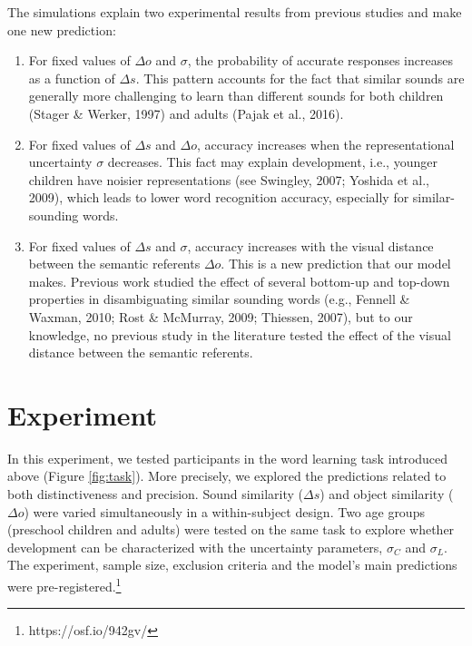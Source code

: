 \documentclass[english,,man,floatsintext]{apa6}
\let\rmarkdownfootnote\footnote%
\def\footnote{\protect\rmarkdownfootnote}
\theoremstyle{definition}
\theoremstyle{definition}
\theoremstyle{definition}
\theoremstyle{remark}
\begin{document}
The simulations explain two experimental results from previous studies
and make one new prediction:

\begin{enumerate}
\def\labelenumi{\arabic{enumi})}
\item
  For fixed values of \(\Delta o\) and \(\sigma\), the probability of
  accurate responses increases as a function of \(\Delta s\). This
  pattern accounts for the fact that similar sounds are generally more
  challenging to learn than different sounds for both children (Stager
  \& Werker, 1997) and adults (Pajak et al., 2016).
\item
  For fixed values of \(\Delta s\) and \(\Delta o\), accuracy increases
  when the representational uncertainty \(\sigma\) decreases. This fact
  may explain development, i.e., younger children have noisier
  representations (see Swingley, 2007; Yoshida et al., 2009), which
  leads to lower word recognition accuracy, especially for
  similar-sounding words.
\item
  For fixed values of \(\Delta s\) and \(\sigma\), accuracy increases
  with the visual distance between the semantic referents \(\Delta o\).
  This is a new prediction that our model makes. Previous work studied
  the effect of several bottom-up and top-down properties in
  disambiguating similar sounding words (e.g., Fennell \& Waxman, 2010;
  Rost \& McMurray, 2009; Thiessen, 2007), but to our knowledge, no
  previous study in the literature tested the effect of the visual
  distance between the semantic referents.
\end{enumerate}

\section{Experiment}\label{experiment}

In this experiment, we tested participants in the word learning task
introduced above (Figure \ref{fig:task}). More precisely, we explored
the predictions related to both distinctiveness and precision. Sound
similarity (\(\Delta s\)) and object similarity (\(\Delta o\)) were
varied simultaneously in a within-subject design. Two age groups
(preschool children and adults) were tested on the same task to explore
whether development can be characterized with the uncertainty
parameters, \(\sigma_C\) and \(\sigma_L\). The experiment, sample size,
exclusion criteria and the model's main predictions were
pre-registered.\footnote{https://osf.io/942gv/}
\end{document}
